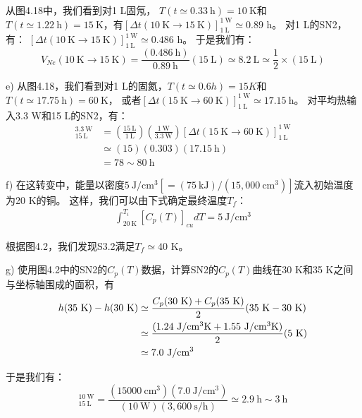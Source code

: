 从图4.18中，我们看到对1 L固氖， $T(t\simeq 0.33\ \mathrm{h})=10\ \mathrm{K}$和$T(t\simeq
1.22\ \mathrm{h})=15\ \mathrm{K}$，有$[\Delta t(10\ \mathrm{K}\rightarrow 15\ \mathrm{K})]_{1\ \mathrm{L}}^{1\ \mathrm{W}}\simeq 0.89$ h。
对1 L的SN2，有：
$[\Delta t(10\ \mathrm{K}\rightarrow 15\ \mathrm{K})]_{1\ \mathrm{L}}^{1\ \mathrm{W}}\simeq 0.486$ h。
于是我们有：
\begin{equation*}%
V_{Ne}(10\ \mathrm{K}\rightarrow 15\ \mathrm{K})=\frac{(0.486\ \mathrm{h})}{0.89\ \mathrm{h}}(15\ \mathrm{L})\simeq 8.2 \ \mathrm{L}\simeq\frac{1}{2}\times(15\ \mathrm{L})
\end{equation*}

e) 从图4.18，我们看到对1 L的固氮，$T(t\simeq 0.6 h)=15 K$和$T(t\simeq 17.75\ \mathrm{h}) = 60\ \mathrm{K}$，
或者$[\Delta t(15\ \mathrm{K}\rightarrow 60\ \mathrm{K})]_{1\ \mathrm{L}}^{1\ \mathrm{W}}\simeq 17.15\ \mathrm{h}$。
对平均热输入3.3 W和15 L的SN2，有：
\begin{align*}%
[\Delta t(15\ \mathrm{K} \rightarrow 60\ \mathrm{K})]_{15\ \mathrm{L}}^{3.3\ \mathrm{W}}&=(\frac{15\ \mathrm{L}}{1\ \mathrm{L}})(\frac{1\ \mathrm{W}}{3.3\ \mathrm{W}})[\Delta t(15\ \mathrm{K}\rightarrow 60\ \mathrm{K})]_{1\ \mathrm{L}}^{1\ \mathrm{W}}\\
&\simeq(15)(0.303)(17.15\ \mathrm{h})\\
&=78\sim 80\ \mathrm{h}
\end{align*}

f) 在这转变中，能量以密度$5\ \mathrm{J/cm^3}[= (75\ \mathrm{kJ})/(15,000\ \mathrm{cm^3})]$流入初始温度为20 K的铜。
这样，我们可以由下式确定最终温度$T_f$：
\begin{align*}%
\int_{20\ \mathrm{K}}^{T_i}[C_p(T)]_{cu}dT=5\ \mathrm{J/cm^3} \tag{S3.2}
\end{align*}

根据图4.2，我们发现S3.2满足$T_f\simeq 40$ K。

g) 使用图4.2中的SN2的$C_p(T)$数据，计算SN2的$C_p(T)$曲线在30 K和35 K之间
与坐标轴围成的面积，有
\begin{align*}%
h(35\ \mathrm{K})-h(30\ \mathrm{K})&\simeq\frac{C_p(30\ \mathrm{K})+C_p(35\ \mathrm{K})}{2}(35\ \mathrm{K}-30\ \mathrm{K})\\\notag
&\simeq\frac{(1.24\ \mathrm{J/cm^3 K}+1.55\ \mathrm{J/cm^3 K})}{2}(5\ \mathrm{K})\\\notag
&\simeq 7.0\ \mathrm{J/cm^3}
\end{align*}

于是我们有：
\begin{equation*}%
[\Delta t(30\ \mathrm{K} \rightarrow 35\ \mathrm{K})]_{15\ \mathrm{L}}^{10\ \mathrm{W}}=\frac{(15000\ \mathrm{cm^3})(7.0\ \mathrm{J/cm^3})}{(10\ \mathrm{W})(3,600\ \mathrm{s/h})}
\simeq 2.9\ \mathrm{h}\sim 3\ \mathrm{h}
\end{equation*}

